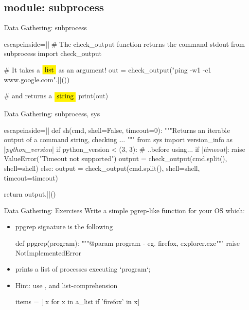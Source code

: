 \subsection{module: subprocess}
\begin{pyframe}{Data Gathering: subprocess}

%

\begin{pycode*}{escapeinside=||}
# The check_output function returns the command stdout
from subprocess import check_output

# It takes a $\pyver{list}$ as an argument!
out = check_output("ping -w1 -c1 www.google.com".||())

# and returns a $\pyver{string}$
print(out)
\end{pycode*}
\end{pyframe}

\begin{pyframe}{Data Gathering: subprocess, sys}
\begin{pycode*}{escapeinside=||}
def sh(cmd, shell=False, timeout=0):
  """Returns an iterable output of a command string, checking ... """
  from sys import version_info as |\emph{python\_version}|
  if python_version < (3, 3): # ..before using...
    if |\emph{timeout}|:
      raise ValueError("Timeout not supported")
    output = check_output(cmd.split(), shell=shell)
  else:
    output = check_output(cmd.split(), shell=shell, timeout=timeout)

  return output.||()
  
    
    
\end{pycode*}
\end{pyframe}

\begin{pyframe}{Data Gathering: Exercises}
Write a simple pgrep-like function for your OS which:
\begin{itemize}
\item ppgrep signature is the following
\begin{pycode}
def ppgrep(program):
    """@param program - eg. firefox, explorer.exe"""
    raise NotImplementedError
\end{pycode}
\item prints a list of processes executing `program`;
\item Hint: use , and list-comprehension
\begin{pycode}
items = [ x for x in a_list if 'firefox' in x]
\end{pycode}
\end{itemize}
\end{pyframe}


